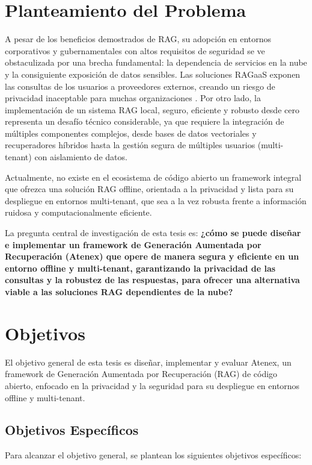 \section{Planteamiento del Problema}

A pesar de los beneficios demostrados de RAG, su adopción en entornos corporativos y gubernamentales con altos requisitos de seguridad se ve obstaculizada por una brecha fundamental: la dependencia de servicios en la nube y la consiguiente exposición de datos sensibles. Las soluciones RAGaaS exponen las consultas de los usuarios a proveedores externos, creando un riesgo de privacidad inaceptable para muchas organizaciones \cite{Cheng2025RemoteRAG}. Por otro lado, la implementación de un sistema RAG local, seguro, eficiente y robusto desde cero representa un desafío técnico considerable, ya que requiere la integración de múltiples componentes complejos, desde bases de datos vectoriales y recuperadores híbridos hasta la gestión segura de múltiples usuarios (multi-tenant) con aislamiento de datos.

Actualmente, no existe en el ecosistema de código abierto un framework integral que ofrezca una solución RAG offline, orientada a la privacidad y lista para su despliegue en entornos multi-tenant, que sea a la vez robusta frente a información ruidosa y computacionalmente eficiente.

La pregunta central de investigación de esta tesis es: \textbf{¿cómo se puede diseñar e implementar un framework de Generación Aumentada por Recuperación (Atenex) que opere de manera segura y eficiente en un entorno offline y multi-tenant, garantizando la privacidad de las consultas y la robustez de las respuestas, para ofrecer una alternativa viable a las soluciones RAG dependientes de la nube?}

\section{Objetivos}

El objetivo general de esta tesis es diseñar, implementar y evaluar Atenex, un framework de Generación Aumentada por Recuperación (RAG) de código abierto, enfocado en la privacidad y la seguridad para su despliegue en entornos offline y multi-tenant.

\subsection{Objetivos Específicos}

Para alcanzar el objetivo general, se plantean los siguientes objetivos específicos:

